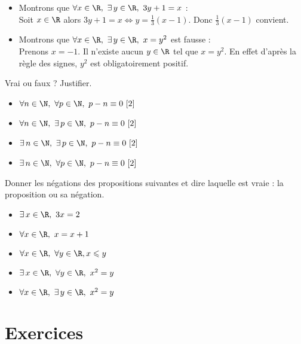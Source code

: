 \begin{exemple}[s]
	\begin{itemize}
		\item 	Montrons que $\forall x \in \R,\ \exists\, y\in \R,\ 3y+1=x$ :\\
		      Soit $x\in\R$ alors $3y+1=x\Leftrightarrow y=\frac{1}{3}(x-1)$. Donc  $\frac{1}{3}(x-1)$ convient.
		\item 	Montrons que $\forall x\in\R,\ \exists\, y\in\R,\ x=y^2$ est fausse :\\
		      Prenons $x=-1$. Il n'existe aucun $y\in\R$ tel que $x=y^2$. En effet d'après la règle des signes, $y^2$ est obligatoirement positif.
	\end{itemize}
\end{exemple}

\begin{exercice}[]
	Vrai ou faux ? Justifier.
	\begin{itemize}
		\item 	$\forall n \in \N,\ \forall p \in \N,\ p-n \equiv 0\ [2]$
		\item 	$\forall n \in \N,\ \exists\, p \in \N,\ p-n \equiv 0\ [2]$
		\item 	$\exists\, n \in \N,\ \exists\, p \in \N,\ p-n \equiv 0\ [2]$
		\item 	$\exists\, n \in \N,\ \forall p \in \N,\ p-n \equiv 0\ [2]$
	\end{itemize}
\end{exercice}

\begin{exercice}[]
	Donner les négations des propositions suivantes et dire laquelle est vraie : la proposition ou sa négation.
	\begin{itemize}
		\item 	$\exists\, x\in\R,\ 3x=2$
		\item 	$\forall x\in\R,\ x=x+1$
		\item 	$\forall x\in\R,\ \forall y\in\R, x\leqslant y$
		\item 	$\exists\, x\in\R,\ \forall y\in\R,\ x^2=y$
		\item 	$\forall x\in\R,\ \exists\, y\in\R,\ x^2=y$
	\end{itemize}
\end{exercice}


\section{Exercices}


